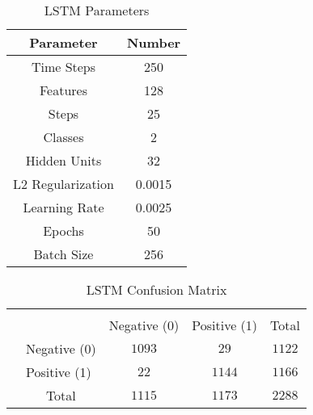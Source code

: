 {
\begin{table}[h!]
\centering
\begin{tabular}{|c|c|}
\hline
Parameter &Number \\
\hline
Time Steps & 250  \\
Features & 128  \\
Steps & 25  \\
Classes & 2 \\
Hidden Units & 32 \\
L2 Regularization & 0.0015 \\
Learning Rate & 0.0025 \\
Epochs & 50 \\
Batch Size & 256 \\
\hline
\end{tabular}
\caption{LSTM Parameters}
\label{table:1}
\end{table}
}



{
\begin{table}[h!]
\centering
\begin{tabular}{l|l|c|c|c}
\multicolumn{2}{c}{}&\multicolumn{2}{c}{}&\\
\cline{3-4}
\multicolumn{2}{c|}{}&Negative (0)&Positive (1)&\multicolumn{1}{c}{Total}\\
\cline{2-4}
\multirow{}{}{}& Negative (0) & $1093$ & $29$ & $1122$\\
\cline{2-4}
& Positive (1) & $22$ & $1144$ & $1166$\\
\cline{2-4}
\multicolumn{1}{c}{} & \multicolumn{1}{c}{Total} & \multicolumn{1}{c}{$1115$} & \multicolumn{    1}{c}{$1173$} & \multicolumn{1}{c}{$2288$}\\
\end{tabular}
\caption{LSTM Confusion Matrix}
\label{table:1}
\end{table}
}

